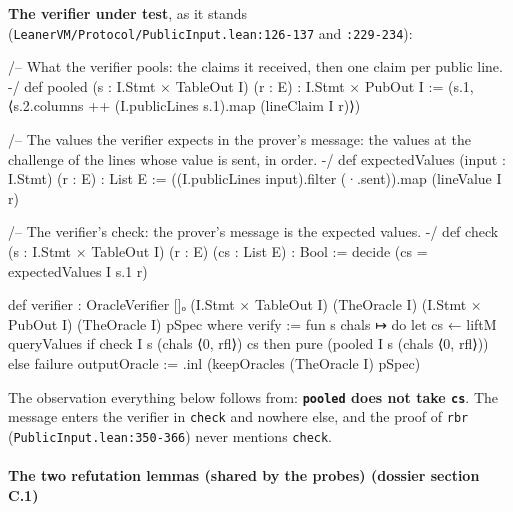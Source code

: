 \textbf{The verifier under test}, as it stands (\texttt{L\allowbreak{}e\allowbreak{}a\allowbreak{}n\allowbreak{}e\allowbreak{}r\allowbreak{}V\allowbreak{}M\allowbreak{}/\allowbreak{}P\allowbreak{}r\allowbreak{}o\allowbreak{}t\allowbreak{}o\allowbreak{}c\allowbreak{}o\allowbreak{}l\allowbreak{}/\allowbreak{}P\allowbreak{}u\allowbreak{}b\allowbreak{}l\allowbreak{}i\allowbreak{}c\allowbreak{}I\allowbreak{}n\allowbreak{}p\allowbreak{}u\allowbreak{}t\allowbreak{}.\allowbreak{}l\allowbreak{}e\allowbreak{}a\allowbreak{}n\allowbreak{}:\allowbreak{}1\allowbreak{}2\allowbreak{}6\allowbreak{}-{}\allowbreak{}1\allowbreak{}3\allowbreak{}7} and \texttt{:229-{}234}):

\begin{leancode}
/-- What the verifier pools: the claims it received, then one claim per public line. -/
def pooled (s : I.Stmt × TableOut I) (r : E) : I.Stmt × PubOut I :=
  (s.1, ⟨s.2.columns ++ (I.publicLines s.1).map (lineClaim I r)⟩)

/-- The values the verifier expects in the prover's message: the values at the challenge of the
lines whose value is sent, in order. -/
def expectedValues (input : I.Stmt) (r : E) : List E :=
  ((I.publicLines input).filter (·.sent)).map (lineValue I r)

/-- The verifier's check: the prover's message is the expected values. -/
def check (s : I.Stmt × TableOut I) (r : E) (cs : List E) : Bool :=
  decide (cs = expectedValues I s.1 r)
\end{leancode}

\begin{leancode}
def verifier : OracleVerifier []ₒ (I.Stmt × TableOut I) (TheOracle I)
    (I.Stmt × PubOut I) (TheOracle I) pSpec where
  verify := fun s chals ↦ do
    let cs ← liftM queryValues
    if check I s (chals ⟨0, rfl⟩) cs then pure (pooled I s (chals ⟨0, rfl⟩)) else failure
  outputOracle := .inl (keepOracles (TheOracle I) pSpec)
\end{leancode}

The observation everything below follows from: \textbf{\texttt{pooled} does not take \texttt{cs}}. The message enters the verifier in \texttt{check} and nowhere else, and the proof of \texttt{rbr} (\texttt{PublicInput.\allowbreak{}lean:350-{}366}) never mentions \texttt{check}.

\paragraph{The two refutation lemmas (shared by the probes) (dossier section C.1)}\label{sec:gen-pubinput-C1}

